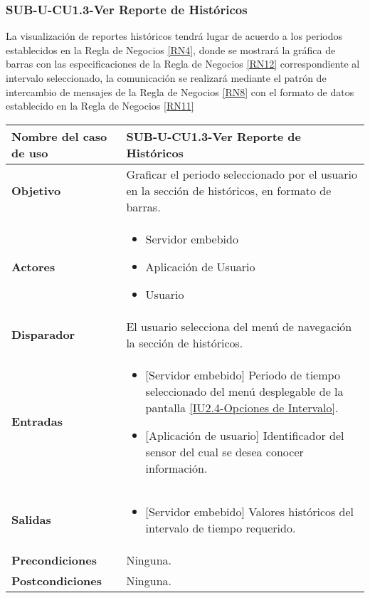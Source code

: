 \subsubsection{SUB-U-CU1.3-Ver Reporte de Históricos}\label{SUB-U-CU1.3}
La visualización de reportes históricos tendrá lugar de acuerdo a los periodos establecidos en la Regla de Negocios \ref{RN4}, donde se mostrará la gráfica de barras con las especificaciones de la Regla de Negocios \ref{RN12} correspondiente al intervalo seleccionado, la comunicación se realizará mediante el patrón de intercambio de mensajes de la Regla de Negocios \ref{RN8} con el formato de datos establecido en la Regla de Negocios \ref{RN11}

\begin{longtable}{|J{5cm}|J{10.3cm}|}
	\hline
	\textbf{Nombre del caso de uso} &
		SUB-U-CU1.3-Ver Reporte de Históricos \\ \hline
	\textbf{Objetivo} &
		Graficar el periodo seleccionado por el usuario en la sección de históricos, en formato de barras. \\ \hline
	\textbf{Actores} &
		\begin{itemize}
			\item Servidor embebido
			\item Aplicación de Usuario
			\item Usuario 
		\end{itemize} \\ \hline
	\textbf{Disparador} & 
		El usuario selecciona del menú de navegación la sección de históricos. \\ \hline 
	\textbf{Entradas} & 
		\begin{itemize}
			\item{[Servidor embebido]} Periodo de tiempo seleccionado del menú desplegable de la pantalla \hyperref[fig:Opciones de Intervalo]{[IU2.4-Opciones de Intervalo]}.
			\item{[Aplicación de usuario]} Identificador del sensor del cual se desea conocer información.
		\end{itemize}\\ \hline 
	\textbf{Salidas} & 
		\begin{itemize}
			\item{[Servidor embebido]} Valores históricos del intervalo de tiempo requerido.
		\end{itemize} \\ \hline
	\textbf{Precondiciones} &
		Ninguna.\\ \hline
	\textbf{Postcondiciones} &
		Ninguna.\\ \hline

\end{longtable}
